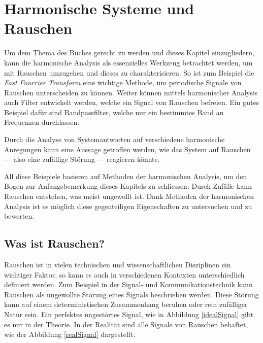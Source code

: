 %
%
%
%

\section{Harmonische Systeme und Rauschen\label{brown:Rauschen}}

Um dem Thema des Buches gerecht zu werden und dieses Kapitel einzugliedern, kann die harmonische Analysis als essenzielles Werkzeug betrachtet werden, um mit Rauschen umzugehen und dieses zu charakterisieren. 
So ist zum Beispiel die \textit{Fast Fourrier Transform} eine wichtige Methode, um periodische Signale von Rauschen unterscheiden zu können. Weiter können mittels harmonischer Analysis auch Filter entwickelt werden, welche ein Signal von Rauschen befreien. Ein gutes Beispiel dafür sind Bandpassfilter, welche nur ein bestimmtes Band an Frequenzen durchlassen.


Durch die Analyse von Systemantworten auf verschiedene harmonische Anregungen kann eine Aussage getroffen werden, wie das System auf Rauschen --- also eine zufällige Störung --- reagieren könnte.


All diese Beispiele basieren auf Methoden der harmonischen Analysis, um den Bogen zur Anfangsbemerkung dieses Kapitels zu schliessen: Durch Zufälle kann Rauschen entstehen, was meist ungewollt ist. Dank Methoden der harmonischen Analysis ist es möglich diese gegenteiligen Eigenschaften zu untersuchen und zu bewerten.


\subsection{Was ist Rauschen?\label{brown:Rauschen:Arten}}
Rauschen ist in vielen technischen und wissenschaftlichen Disziplinen ein wichtiger Faktor, so kann es auch in verschiedenen Kontexten unterschiedlich definiert werden. Zum Beispiel in der Signal- und Kommunikationstechnik kann Rauschen als ungewollte Störung eines Signals beschrieben werden. Diese Störung kann auf einem deterministischen Zusammenhang beruhen oder rein zufälliger Natur sein. Ein perfektes ungestörtes Signal, wie in Abbildung \ref{idealSignal} gibt es nur in der Theorie. In der Realität sind alle Signale von Rauschen behaftet, wie der Abbildung \ref{realSignal} dargestellt.

